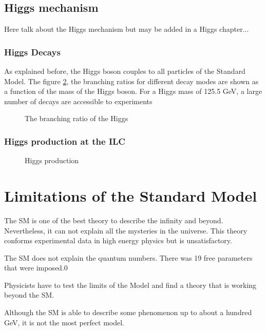     \subsection{Higgs mechanism}

    Here talk about the Higgs mechanism but may be added in a Higgs chapter...


   \subsubsection{Higgs Decays}

   As explained before, the Higgs boson couples to all particles of the Standard Model.
   The figure \ref{fig:higgsBR}, the branching ratios for different decay modes are shown as a function of the mass of the Higgs boson.
   For a Higgs mass of 125.5 GeV, a large number of decays are accessible to experiments

    \begin{figure}[h]
    \centering
    \caption{The branching ratio of the Higgs}
    \label{fig:higgsBR}
    \end{figure}

   \subsubsection{Higgs production at the ILC}
    
    \begin{figure}[h]
    \centering
    \caption{Higgs production}
    \label{fig:higgsBR}
    \end{figure}
      
  \section{Limitations of the Standard Model}

  The SM is one of the best theory to describe the infinity and beyond. 
  Nevertheless, it can not explain all the mysteries in the universe. 
  This theory conforms experimental data in high energy physics but is unsatisfactory.
  
  The SM does not explain the quantum numbers. There was 19 free parameters that were imposed.0 

  Physicists have to test the limits of the Model and find a theory that is working beyond the SM. 

  Although the SM is able to describe some phenomenon up to about a hundred GeV, it is not the most perfect model.


